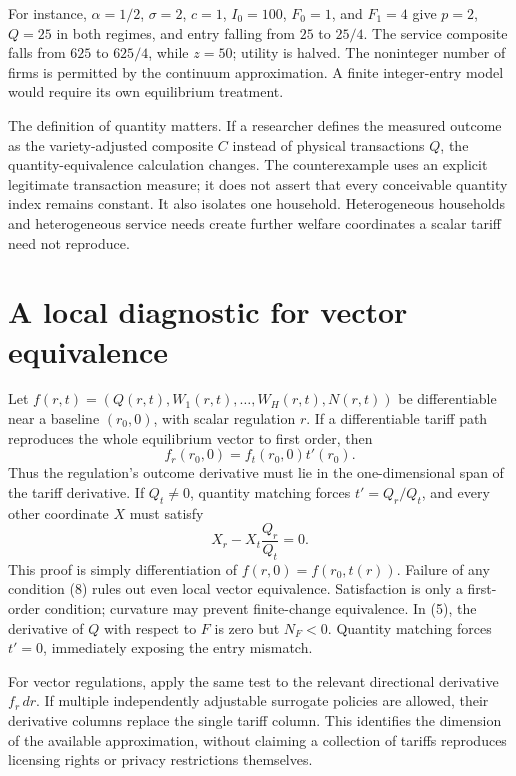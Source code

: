 \documentclass[11pt]{article}
\begin{document}
For instance, $\alpha=1/2$, $\sigma=2$, $c=1$, $I_0=100$, $F_0=1$, and $F_1=4$ give $p=2$, $Q=25$ in both regimes, and entry falling from $25$ to $25/4$. The service composite falls from $625$ to $625/4$, while $z=50$; utility is halved. The noninteger number of firms is permitted by the continuum approximation. A finite integer-entry model would require its own equilibrium treatment.

The definition of quantity matters. If a researcher defines the measured outcome as the variety-adjusted composite $C$ instead of physical transactions $Q$, the quantity-equivalence calculation changes. The counterexample uses an explicit legitimate transaction measure; it does not assert that every conceivable quantity index remains constant. It also isolates one household. Heterogeneous households and heterogeneous service needs create further welfare coordinates a scalar tariff need not reproduce.

\section*{A local diagnostic for vector equivalence}
Let $f(r,t)=(Q(r,t),W_1(r,t),\ldots,W_H(r,t),N(r,t))$ be differentiable near a baseline $(r_0,0)$, with scalar regulation $r$. If a differentiable tariff path reproduces the whole equilibrium vector to first order, then
\[
 f_r(r_0,0)=f_t(r_0,0)t'(r_0).                              \tag{7}
\]
Thus the regulation's outcome derivative must lie in the one-dimensional span of the tariff derivative. If $Q_t\ne0$, quantity matching forces $t'=Q_r/Q_t$, and every other coordinate $X$ must satisfy
\[
 X_r-X_t\frac{Q_r}{Q_t}=0.                                 \tag{8}
\]
This proof is simply differentiation of $f(r,0)=f(r_0,t(r))$. Failure of any condition (8) rules out even local vector equivalence. Satisfaction is only a first-order condition; curvature may prevent finite-change equivalence. In (5), the derivative of $Q$ with respect to $F$ is zero but $N_F<0$. Quantity matching forces $t'=0$, immediately exposing the entry mismatch.

For vector regulations, apply the same test to the relevant directional derivative $f_r\,dr$. If multiple independently adjustable surrogate policies are allowed, their derivative columns replace the single tariff column. This identifies the dimension of the available approximation, without claiming a collection of tariffs reproduces licensing rights or privacy restrictions themselves.
\end{document}
